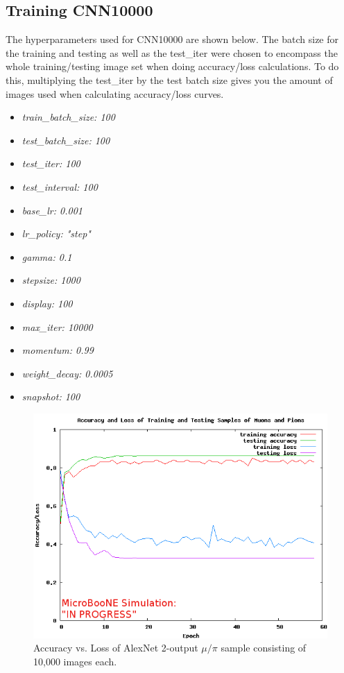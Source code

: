 \subsection{Training CNN10000}
The hyperparameters used for CNN10000 are shown below. The batch size for the training and testing as well as the test{\_}iter were chosen to encompass the whole training/testing image set when doing accuracy/loss calculations. To do this, multiplying the test{\_}iter by the test batch size gives you the amount of images used when calculating accuracy/loss curves. 

\begin{multicols}{3}
\begin{itemize}
 \item \textit{train{\_}batch{\_}size: 100}
 \item \textit{test{\_}batch{\_}size: 100}
 \item \textit{test{\_}iter: 100}
 \item \textit{test{\_}interval: 100}
 \item \textit{base{\_}lr: 0.001}
 \item \textit{lr{\_}policy: "step"}
 \item \textit{gamma: 0.1}
 \item \textit{stepsize: 1000}
 \item \textit{display: 100}
 \item \textit{max{\_}iter: 10000}
 \item \textit{momentum: 0.99}
 \item \textit{weight{\_}decay: 0.0005}
 \item \textit{snapshot: 100}
\end{itemize}
\end{multicols}

\begin{figure}[htp!]
\centering
\includegraphics[width=\textwidth]{figs/acc_loss_10000_062117.png}
\caption{Accuracy vs. Loss of AlexNet 2-output $\mu/\pi$ sample consisting of 10,000 images each.} 
\label{fig:loss_accuracy}
\end{figure}

